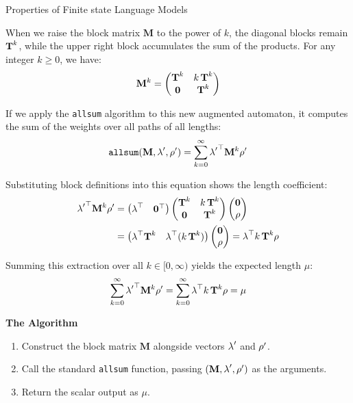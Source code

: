 \begin{question}{Properties of Finite state Language Models}
\begin{subquestion}
When we raise the block matrix $\mathbf{M}$ to the power of $k$, the diagonal blocks remain $\transMtx^k$, while the upper right block accumulates the sum of the products. For any integer $k \ge 0$, we have:
\begin{equation}
    \mathbf{M}^k = \begin{pmatrix} \transMtx^k & k\,\transMtx^k \\ \mathbf{0} & \transMtx^k \end{pmatrix}
\end{equation}

If we apply the \texttt{allsum} algorithm to this new augmented automaton, it computes the sum of the weights over all paths of all lengths:
\begin{equation}
    \texttt{allsum}(\mathbf{M}, \initf', \finalf') = \sum_{k=0}^{\infty} {\initf'}^\top \mathbf{M}^k \finalf'
\end{equation}

Substituting block definitions into this equation shows the length coefficient:
\begin{align}
    {\initf'}^\top \mathbf{M}^k \finalf'
    &= \begin{pmatrix} \initf^\top & \mathbf{0}^\top \end{pmatrix}
       \begin{pmatrix} \transMtx^k & k\,\transMtx^k \\ \mathbf{0} & \transMtx^k \end{pmatrix}
       \begin{pmatrix} \mathbf{0} \\ \finalf \end{pmatrix} \\
    &= \begin{pmatrix} \initf^\top \transMtx^k & \initf^\top (k\,\transMtx^k) \end{pmatrix}
       \begin{pmatrix} \mathbf{0} \\ \finalf \end{pmatrix} = \initf^\top k\,\transMtx^k \finalf
\end{align}

Summing this extraction over all $k \in [0, \infty)$ yields the expected length $\mu$:
\begin{equation}
    \sum_{k=0}^{\infty} {\initf'}^\top \mathbf{M}^k \finalf' = \sum_{k=0}^{\infty} \initf^\top k\,\transMtx^k \finalf = \mu
\end{equation}

\textbf{The Algorithm}
\begin{enumerate}
    \item Construct the block matrix $\mathbf{M}$ alongside vectors $\initf'$ and $\finalf'$.
    \item Call the standard \texttt{allsum} function, passing $(\mathbf{M}, \initf', \finalf')$ as the arguments.
    \item Return the scalar output as $\mu$.
\end{enumerate}


\end{subquestion}
\end{question}
